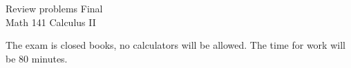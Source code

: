 \documentclass{article}
\begin{document}
\begin{center}
\Large
Review problems Final\\ Math 141 Calculus II \\
\end{center}


\noindent The exam is closed books, no calculators will be allowed. The time for work will be 80 minutes. %
\end{document}
